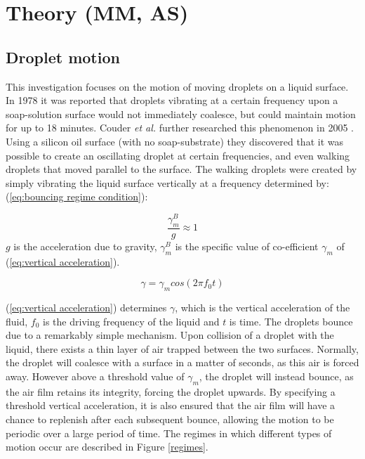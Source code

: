\section{Theory (MM, AS)}\label{theory}
\subsection{Droplet motion}
This investigation focuses on the motion of moving droplets on a liquid surface. In 1978 it was reported \cite{Walker} that droplets vibrating at a certain frequency upon a soap-solution surface would not immediately coalesce, but could maintain motion for up to 18 minutes. Couder \textit{et al.} further researched this phenomenon in 2005 \cite{couder}. Using a silicon oil surface (with no soap-substrate) they discovered that it was possible to create an oscillating droplet at certain frequencies, and even walking droplets that moved parallel to the surface. 
The walking droplets were created by simply vibrating the liquid surface vertically at a frequency determined by: (\ref{eq:bouncing regime condition}):

\begin{equation} \label{eq:bouncing regime condition}
\frac{\gamma_{m}^{B}}{g}\approx 1
\end{equation}
$g$ is the acceleration due to gravity, $\gamma_{m}^{B}$ is the specific value of co-efficient $\gamma_{m}$ of (\ref{eq:vertical acceleration}).


\begin{equation} \label{eq:vertical acceleration}
\gamma=\gamma_{m}cos(2 \pi f_0t) 
\end{equation}

(\ref{eq:vertical acceleration}) determines $\gamma$, which is the vertical acceleration of the fluid, $f_0$ is the driving frequency of the liquid and $t$ is time. The droplets bounce due to a remarkably simple mechanism. Upon collision of a droplet with the liquid, there exists a thin layer of air trapped between the two surfaces. Normally, the droplet will coalesce with a surface in a matter of seconds, as this air is forced away. However above a threshold value of $\gamma_{m}$, the droplet will instead bounce, as the air film retains its integrity, forcing the droplet upwards. By specifying a threshold vertical acceleration, it is also ensured that the air film will have a chance to replenish after each subsequent bounce, allowing the motion to be periodic over a large period of time. The regimes in which different types of motion occur are described in Figure \ref{regimes}.


